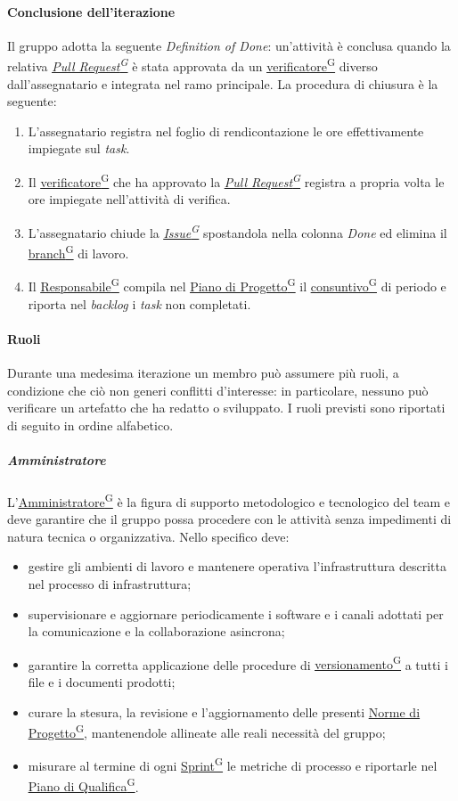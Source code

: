 \documentclass[a4paper,12pt]{article}
\providecommand{\glslink}[2]{\href{https://alittlebyte-19.github.io/Documentazione/glossario.html\#gls-#1}{\underline{#2}\textsuperscript{\scriptsize G}}}
\begin{document}
\paragraph{Conclusione dell'iterazione}
Il gruppo adotta la seguente \textit{Definition of Done}: un'attività è conclusa quando la relativa \textit{\glslink{pull-request}{Pull Request}} è stata approvata da un \glslink{verificatore}{verificatore} diverso dall'assegnatario e integrata nel ramo principale. La procedura di chiusura è la seguente:

\begin{enumerate}
    \item L'assegnatario registra nel foglio di rendicontazione le ore effettivamente impiegate sul \textit{task}.
    \item Il \glslink{verificatore}{verificatore} che ha approvato la \textit{\glslink{pull-request}{Pull Request}} registra a propria volta le ore impiegate nell'attività di verifica.
    \item L'assegnatario chiude la \textit{\glslink{issue}{Issue}} spostandola nella colonna \textit{Done} ed elimina il \glslink{branch}{branch} di lavoro.
    \item Il \glslink{responsabile}{Responsabile} compila nel \glslink{piano-di-progetto}{Piano di Progetto} il \glslink{consuntivo}{consuntivo} di periodo e riporta nel \textit{backlog} i \textit{task} non completati.
\end{enumerate}

\paragraph{Ruoli}
Durante una medesima iterazione un membro può assumere più ruoli, a condizione che ciò non generi conflitti d'interesse: in particolare, nessuno può verificare un artefatto che ha redatto o sviluppato. I ruoli previsti sono riportati di seguito in ordine alfabetico.

\subparagraph{Amministratore}
L'\glslink{amministratore}{Amministratore} è la figura di supporto metodologico e tecnologico del team e deve garantire che il gruppo possa procedere con le attività senza impedimenti di natura tecnica o organizzativa. Nello specifico deve:
\begin{itemize}
    \item gestire gli ambienti di lavoro e mantenere operativa l'infrastruttura descritta nel processo di infrastruttura;
    \item supervisionare e aggiornare periodicamente i software e i canali adottati per la comunicazione e la collaborazione asincrona;
    \item garantire la corretta applicazione delle procedure di \glslink{versioning}{versionamento} a tutti i file e i documenti prodotti;
    \item curare la stesura, la revisione e l'aggiornamento delle presenti \glslink{norme-di-progetto}{Norme di Progetto}, mantenendole allineate alle reali necessità del gruppo;
    \item misurare al termine di ogni \glslink{sprint}{Sprint} le metriche di processo e riportarle nel \glslink{piano-di-qualifica}{Piano di Qualifica}.
\end{itemize}
\end{document}
